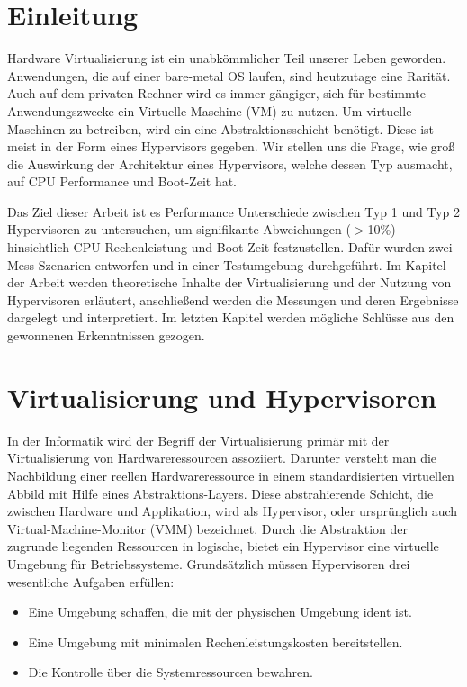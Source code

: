 \documentclass[conference]{IEEEtran}
\begin{document}
\IEEEpeerreviewmaketitle

\section{Einleitung}
\label{Einleitung}
Hardware Virtualisierung ist ein unabkömmlicher Teil unserer Leben geworden. Anwendungen, die auf einer bare-metal OS laufen, sind heutzutage eine Rarität. Auch auf dem privaten Rechner wird es immer gängiger, sich für bestimmte Anwendungszwecke ein Virtuelle Maschine (VM) zu nutzen. Um virtuelle Maschinen zu betreiben, wird ein eine Abstraktionsschicht benötigt. Diese ist meist in der Form eines Hypervisors gegeben. Wir stellen uns die Frage, wie groß die Auswirkung der Architektur eines Hypervisors, welche dessen Typ ausmacht, auf CPU Performance und Boot-Zeit hat. 

Das Ziel dieser Arbeit ist es Performance Unterschiede zwischen Typ 1 und Typ 2 Hypervisoren zu untersuchen, um signifikante Abweichungen ($>$10\%) hinsichtlich CPU-Rechenleistung und Boot Zeit festzustellen. Dafür wurden zwei Mess-Szenarien entworfen und in einer Testumgebung durchgeführt. Im Kapitel der Arbeit werden theoretische Inhalte der Virtualisierung und der Nutzung von Hypervisoren erläutert, anschließend werden die Messungen und deren Ergebnisse dargelegt und interpretiert. Im letzten Kapitel werden mögliche Schlüsse aus den gewonnenen Erkenntnissen gezogen. 

\section{Virtualisierung und Hypervisoren}
\label{Virtualisierung und Hypervisoren}	
In der Informatik wird der Begriff der Virtualisierung primär mit der Virtualisierung von Hardwareressourcen assoziiert. Darunter versteht man die Nachbildung einer reellen Hardwareressource in einem standardisierten virtuellen Abbild mit Hilfe eines Abstraktions-Layers. Diese abstrahierende Schicht, die zwischen Hardware und Applikation, wird als Hypervisor, oder ursprünglich auch Virtual-Machine-Monitor (VMM) bezeichnet. \cite{Portnoy2016} Durch die Abstraktion der zugrunde liegenden Ressourcen in logische, bietet ein Hypervisor eine virtuelle Umgebung für Betriebssysteme. Grundsätzlich müssen Hypervisoren drei wesentliche Aufgaben erfüllen: 
\begin{itemize}
	\item Eine Umgebung schaffen, die mit der physischen Umgebung ident ist. 
	\item Eine Umgebung mit minimalen Rechenleistungskosten bereitstellen. 
	\item Die Kontrolle über die Systemressourcen bewahren. 
\end{itemize}
\cite{Popek&Goldberg1974}
\end{document}
